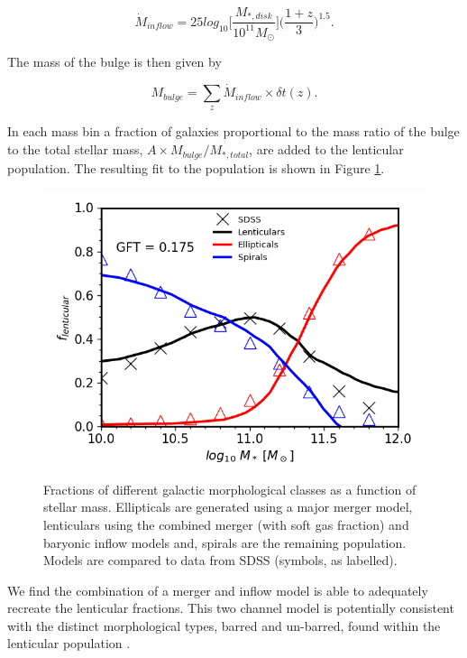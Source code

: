 \begin{equation}
    \label{eqn:DiskInflow}
    \dot{M}_{inflow} = 25 log_{10}\Big[\frac{M_{*,disk}}{10^{11}M_{\odot}}\Big]\Big(\frac{1 + z}{3}\Big)^{1.5}.
\end{equation}

The mass of the bulge is then given by

\begin{equation}
    M_{bulge} = \sum_z \dot{M}_{inflow} \times \delta t(z).
\end{equation}

In each mass bin a fraction of galaxies proportional to the mass ratio of the bulge to the total stellar mass, $A \times M_{bulge} / M_{*, total}$, are added to the lenticular population. The resulting fit to the population is shown in Figure \ref{fig:All_Morphologies}.

\begin{figure}
  \includegraphics[width=\linewidth]{Figures/Chapter5/Bulge_Growth_Final_All_Morph.png}
    \caption{Fractions of different galactic morphological classes as a function of stellar mass. Ellipticals are generated using a major merger model, lenticulars using the combined merger (with soft gas fraction) and baryonic inflow models and, spirals are the remaining population. Models are compared to data from SDSS (symbols, as labelled).}
    \label{fig:All_Morphologies}
\end{figure}

We find the combination of a merger and inflow model is able to adequately recreate the lenticular fractions. This two channel model is potentially consistent with the distinct morphological types, barred and un-barred, found within the lenticular population \cite{Laurikainen2005MulticomponentGalaxies, VanDenBergh2012LuminositiesGalaxies}.

